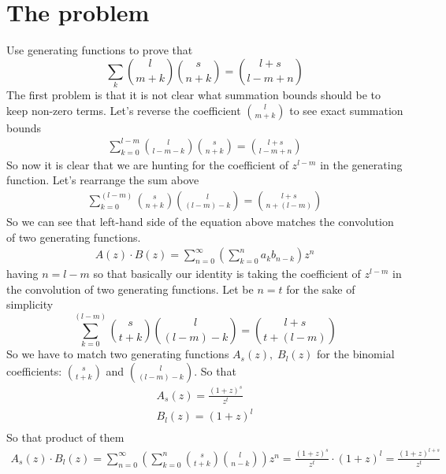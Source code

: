 ﻿\documentclass{article}
\begin{document}
    \section{The problem}\label{sec:the-problem}
    Use generating functions to prove that
    \begin{equation}
        \sum_{k} \binom{l}{m+k} \binom{s}{n+k} = \binom{l+s}{l-m+n}
        \label{eq:identity-to-prove}
    \end{equation}
    The first problem is that it is not clear what summation bounds should be to keep non-zero terms.
    Let's reverse the coefficient $\binom{l}{m+k}$ to see exact summation bounds
    \begin{align*}
        \sum_{k=0}^{l-m} \binom{l}{l-m-k} \binom{s}{n+k} = \binom{l+s}{l-m+n}
    \end{align*}
    So now it is clear that we are hunting for the coefficient of $z^{l-m}$ in the generating function.
    Let's rearrange the sum above
    \begin{align*}
        \sum_{k=0}^{(l-m)} \binom{s}{n+k} \binom{l}{(l-m)-k} = \binom{l+s}{n+(l-m)}
    \end{align*}
    So we can see that left-hand side of the equation above matches the convolution of two generating functions.
    \begin{align*}
        A(z) \cdot B(z) = \sum_{n=0}^{\infty} \left( \sum_{k=0}^{n} a_k b_{n-k} \right) z^n
    \end{align*}
    having $n=l-m$ so that basically our identity is taking the coefficient of $z^{l-m}$
    in the convolution of two generating functions.
    Let be $n=t$ for the sake of simplicity
    \begin{equation}
        \sum_{k=0}^{(l-m)} \binom{s}{t+k} \binom{l}{(l-m)-k} = \binom{l+s}{t+(l-m)}
        \label{eq:identity-to-prove-2}
    \end{equation}
    So we have to match two generating functions $A_s(z), \; B_l(z)$ for
    the binomial coefficients: $\binom{s}{t+k}$ and $\binom{l}{(l-m)-k}$.
    So that
    \begin{align*}
        A_s(z) = \frac{(1+z)^s}{z^t} \\
        B_l(z) = (1+z)^l \\
    \end{align*}
    So that product of them
    \begin{align*}
        A_s(z) \cdot B_l(z) = \sum_{n=0}^{\infty} \left( \sum_{k=0}^{n} \binom{s}{t+k} \binom{l}{n-k} \right) z^n
        = \frac{(1+z)^s}{z^t} \cdot (1+z)^l = \frac{(1+z)^{l+s}}{z^t}
    \end{align*}
\end{document}
